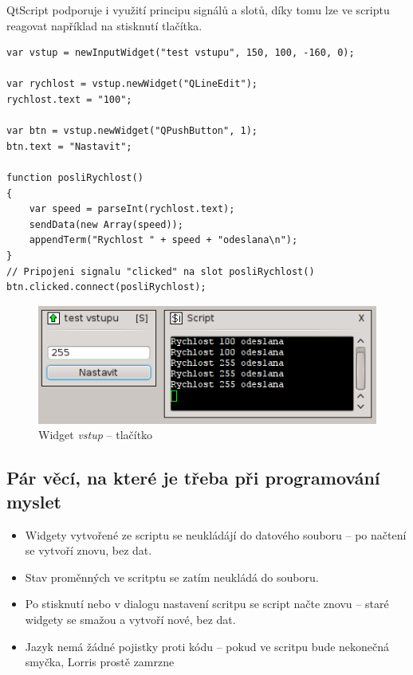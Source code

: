 \documentclass[12pt, a4paper, oneside]{article}
\newcommand{\It}{\textit}  %
\begin{document}
\newpage
QtScript podporuje i využití principu signálů a slotů, díky tomu lze ve scriptu reagovat například na stisknutí tlačítka.

\noindent\begin{minipage}{\textwidth}
\begin{lstlisting}[caption=Widget \It{vstup} -- tlačítko]
var vstup = newInputWidget("test vstupu", 150, 100, -160, 0);

var rychlost = vstup.newWidget("QLineEdit");
rychlost.text = "100";

var btn = vstup.newWidget("QPushButton", 1);
btn.text = "Nastavit";

function posliRychlost()
{
    var speed = parseInt(rychlost.text);
    sendData(new Array(speed));
    appendTerm("Rychlost " + speed + "odeslana\n");
}
// Pripojeni signalu "clicked" na slot posliRychlost()
btn.clicked.connect(posliRychlost);
\end{lstlisting}
\end{minipage}

\begin{figure}[H]
\begin{center}
\includegraphics{img/ref_input2.png}
\caption{Widget \It{vstup} -- tlačítko}
\end{center}
\end{figure}

\subsection*{Pár věcí, na které je třeba při programování myslet}
\begin{itemize}
    \item Widgety vytvořené ze scriptu se neukládájí do datového souboru -- po načtení se vytvoří znovu, bez dat.
    \item Stav proměnných ve scritptu se zatím neukládá do souboru.
    \item Po stisknutí  nebo  v dialogu nastavení scritpu se script načte znovu -- staré widgety se smažou a vytvoří nové, bez dat.
    \item Jazyk nemá žádné pojistky proti  kódu -- pokud ve scritpu bude nekonečná smyčka, Lorris prostě zamrzne
\end{itemize}
\end{document}
